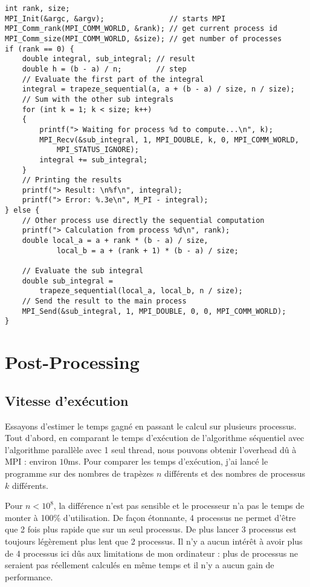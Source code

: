 \documentclass{article}
\begin{document}
\begin{lstlisting}[style=ccode, morekeywords={f, MPI_Recv, MPI_Send, trapeze_sequential}]
int rank, size;
MPI_Init(&argc, &argv);               // starts MPI
MPI_Comm_rank(MPI_COMM_WORLD, &rank); // get current process id
MPI_Comm_size(MPI_COMM_WORLD, &size); // get number of processes
if (rank == 0) {
    double integral, sub_integral; // result
    double h = (b - a) / n;        // step
    // Evaluate the first part of the integral
    integral = trapeze_sequential(a, a + (b - a) / size, n / size);
    // Sum with the other sub integrals
    for (int k = 1; k < size; k++)
    {
        printf("> Waiting for process %d to compute...\n", k);
        MPI_Recv(&sub_integral, 1, MPI_DOUBLE, k, 0, MPI_COMM_WORLD,
            MPI_STATUS_IGNORE);
        integral += sub_integral;
    }
    // Printing the results
    printf("> Result: \n%f\n", integral);
    printf("> Error: %.3e\n", M_PI - integral);
} else {
    // Other process use directly the sequential computation
    printf("> Calculation from process %d\n", rank);
    double local_a = a + rank * (b - a) / size,
            local_b = a + (rank + 1) * (b - a) / size;

    // Evaluate the sub integral
    double sub_integral =
        trapeze_sequential(local_a, local_b, n / size);
    // Send the result to the main process
    MPI_Send(&sub_integral, 1, MPI_DOUBLE, 0, 0, MPI_COMM_WORLD);
}
\end{lstlisting}

\newpage

\section{Post-Processing}

\subsection{Vitesse d'exécution}
Essayons d'estimer le temps gagné en passant le calcul sur plusieurs processus.
Tout d'abord, en comparant le temps d'exécution de l'algorithme séquentiel avec l'algorithme parallèle avec 1 seul thread, nous pouvons obtenir l'overhead dû à MPI : environ $10$ms. Pour comparer les temps d'exécution, j'ai lancé le programme sur des nombres de trapèzes $n$ différents et des nombres de processus $k$ différents.

Pour $n<10^8$, la différence n'est pas sensible et le processeur n'a pas le temps de monter à 100\% d'utilisation.
De façon étonnante, 4 processus ne permet d'être que 2 fois plus rapide que sur un seul processus. De plus lancer 3 processus est toujours légèrement plus lent que 2 processus.
Il n'y a aucun intérêt à avoir plus de 4 processus ici dûs aux limitations de mon ordinateur : plus de processus ne seraient pas réellement calculés en même temps et il n'y a aucun gain de performance.
\newpage
\end{document}
